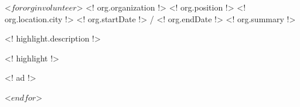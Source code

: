 \begin{cventries}
 <$ for org in volunteer $>
  \cventry
    {<! org.organization !>}
    {<! org.position !>}
    {<! org.location.city !>}
    {<! org.startDate !> / <! org.endDate !>}
    {<! org.summary !>}
    {
          \begin{cvitems}
                    \item{<! highlight.description !>}
                    \item{<! highlight !>}
                    \begin{cvitemssub}
                        \item{<! ad !>}
                    \end{cvitemssub}
          \end{cvitems}
    }
 <$ endfor $>
\end{cventries}
